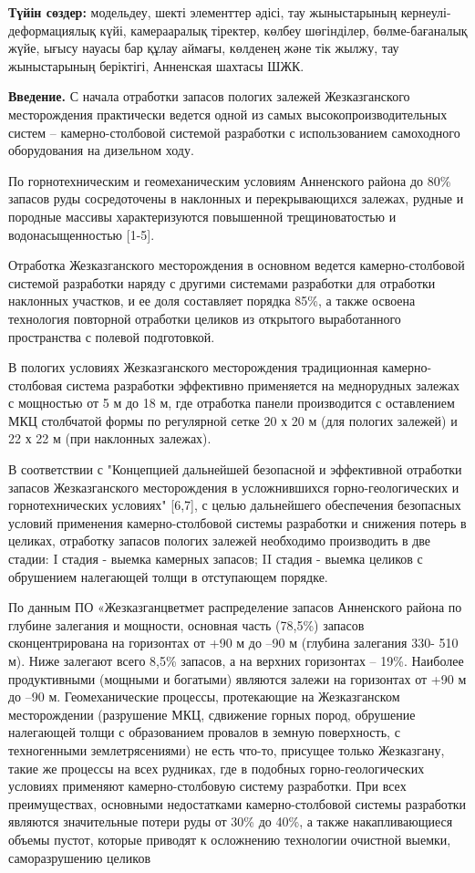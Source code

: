 {\bfseries Түйін сөздер:} модельдеу, шекті элементтер әдісі, тау
жыныстарының кернеулі-деформациялық күйі, камерааралық тіректер, көлбеу
шөгінділер, бөлме-бағаналық жүйе, ығысу науасы бар құлау аймағы,
көлденең және тік жылжу, тау жыныстарының беріктігі, Анненская шахтасы
ШЖК.

{\bfseries Введение.} С начала отработки запасов пологих залежей
Жезказганского месторождения практически ведется одной из самых
высокопроизводительных систем -- камерно-столбовой системой разработки с
использованием самоходного оборудования на дизельном ходу.

По горнотехническим и геомеханическим условиям Анненского района до 80\%
запасов руды сосредоточены в наклонных и перекрывающихся залежах, рудные
и породные массивы характеризуются повышенной трещиноватостью и
водонасыщенностью {[}1-5{]}.

Отработка Жезказганского месторождения в основном ведется
камерно-столбовой системой разработки наряду с другими системами
разработки для отработки наклонных участков, и ее доля составляет
порядка 85\%, а также освоена технология повторной отработки целиков из
открытого выработанного пространства с полевой подготовкой.

В пологих условиях Жезказганского месторождения традиционная
камерно-столбовая система разработки эффективно применяется на
меднорудных залежах с мощностью от 5 м до 18 м, где отработка панели
производится с оставлением МКЦ столбчатой формы по регулярной сетке 20 х
20 м (для пологих залежей) и 22 х 22 м (при наклонных залежах).

В соответствии с "Концепцией дальнейшей безопасной и эффективной
отработки запасов Жезказганского месторождения в усложнившихся
горно-геологических и горнотехнических условиях" {[}6,7{]}, с целью
дальнейшего обеспечения безопасных условий применения камерно-столбовой
системы разработки и снижения потерь в целиках, отработку запасов
пологих залежей необходимо производить в две стадии: I стадия - выемка
камерных запасов; II стадия - выемка целиков с обрушением налегающей
толщи в отступающем порядке.

По данным ПО «Жезказганцветмет распределение запасов Анненского района
по глубине залегания и мощности, основная часть (78,5\%) запасов
сконцентрирована на горизонтах от +90 м до --90 м (глубина залегания
330- 510 м). Ниже залегают всего 8,5\% запасов, а на верхних горизонтах
-- 19\%. Наиболее продуктивными (мощными и богатыми) являются залежи на
горизонтах от +90 м до --90 м. Геомеханические процессы, протекающие на
Жезказганском месторождении (разрушение МКЦ, сдвижение горных пород,
обрушение налегающей толщи с образованием провалов в земную поверхность,
с техногенными землетрясениями) не есть что-то, присущее только
Жезказгану, такие же процессы на всех рудниках, где в подобных
горно-геологических условиях применяют камерно-столбовую систему
разработки. При всех преимуществах, основными недостатками
камерно-столбовой системы разработки являются значительные потери руды
от 30\% до 40\%, а также накапливающиеся объемы пустот, которые приводят
к осложнению технологии очистной выемки, саморазрушению целиков

